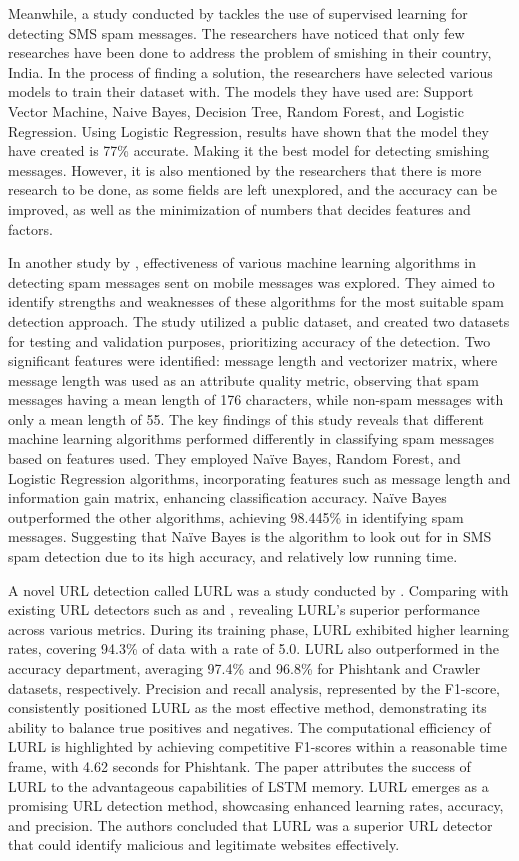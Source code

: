\documentclass[conference]{IEEEtran}
\begin{document}
Meanwhile, a study conducted by \cite{chaurasia2021} tackles the use of supervised learning for detecting SMS spam messages. The researchers have noticed that only few researches have been done to address the problem of smishing in their country, India. In the process of finding a solution, the researchers have selected various models to train their dataset with. The models they have used are: Support Vector Machine, Naive Bayes, Decision Tree, Random Forest, and Logistic Regression. Using Logistic Regression, results have shown that the model they have created is 77\% accurate. Making it the best model for detecting smishing messages. However, it is also mentioned by the researchers that there is more research to be done, as some fields are left unexplored, and the accuracy can be improved, as well as the minimization of numbers that decides features and factors.

In another study by \cite{sethi2017}, effectiveness of various machine learning algorithms in detecting spam messages sent on mobile messages was explored. They aimed to identify strengths and weaknesses of these algorithms for the most suitable spam detection approach. The study utilized a public dataset, and created two datasets for testing and validation purposes, prioritizing accuracy of the detection. Two significant features were identified: message length and vectorizer matrix, where message length was used as an attribute quality metric, observing that spam messages having a mean length of 176 characters, while non-spam messages with only a mean length of 55. The key findings of this study reveals that different machine learning algorithms performed differently in classifying spam messages based on features used. They employed Naïve Bayes, Random Forest, and Logistic Regression algorithms, incorporating features such as message length and information gain matrix, enhancing classification accuracy. Naïve Bayes outperformed the other algorithms, achieving 98.445\% in identifying spam messages. Suggesting that Naïve Bayes is the algorithm to look out for in SMS spam detection due to its high accuracy, and relatively low running time.

A novel URL detection called LURL was a study conducted by \cite{dutta2021}. Comparing with existing URL detectors such as \cite{le2018} and \cite{hong2021}, revealing LURL's superior performance across various metrics. During its training phase, LURL exhibited higher learning rates, covering 94.3\% of data with a rate of 5.0. LURL also outperformed in the accuracy department, averaging 97.4\% and 96.8\% for Phishtank and Crawler datasets, respectively. Precision and recall analysis, represented by the F1-score, consistently positioned LURL as the most effective method, demonstrating its ability to balance true positives and negatives. The computational efficiency of LURL is highlighted by achieving competitive F1-scores within a reasonable time frame, with 4.62 seconds for Phishtank. The paper attributes the success of LURL to the advantageous capabilities of LSTM memory. LURL emerges as a promising URL detection method, showcasing enhanced learning rates, accuracy, and precision. The authors concluded that LURL was a superior URL detector that could identify malicious and legitimate websites effectively.
\end{document}
